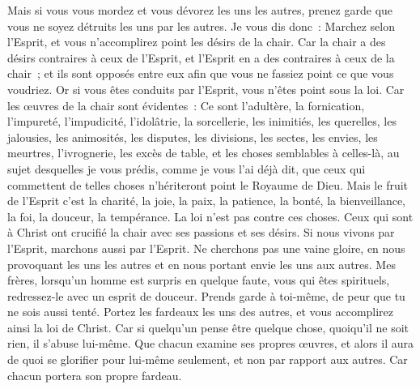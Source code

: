 \begin{multicols}{2}
Mais si vous vous mordez et vous dévorez les uns les autres, prenez garde que vous ne soyez détruits les uns par les autres.
Je vous dis donc~: Marchez selon l'Esprit, et vous n'accomplirez point les désirs de la chair.
Car la chair a des désirs contraires à ceux de l'Esprit, et l'Esprit en a des contraires à ceux de la chair~; et ils sont opposés entre eux afin que vous ne fassiez point ce que vous voudriez.
Or si vous êtes conduits par l'Esprit, vous n'êtes point sous la loi.
Car les œuvres de la chair sont évidentes~: Ce sont l'adultère, la fornication, l'impureté, l'impudicité,
l'idolâtrie, la sorcellerie, les inimitiés, les querelles, les jalousies, les animosités, les disputes, les divisions, les sectes,
les envies, les meurtres, l'ivrognerie, les excès de table, et les choses semblables à celles-là, au sujet desquelles je vous prédis, comme je vous l'ai déjà dit, que ceux qui commettent de telles choses n'hériteront point le Royaume de Dieu.
Mais le fruit de l'Esprit c'est la charité, la joie, la paix, la patience, la bonté, la bienveillance, la foi, la douceur, la tempérance.
La loi n'est pas contre ces choses.
Ceux qui sont à Christ ont crucifié la chair avec ses passions et ses désirs.
Si nous vivons par l'Esprit, marchons aussi par l'Esprit.
Ne cherchons pas une vaine gloire, en nous provoquant les uns les autres et en nous portant envie les uns aux autres.
\VerseOne{}Mes frères, lorsqu'un homme est surpris en quelque faute, vous qui êtes spirituels, redressez-le avec un esprit de douceur. Prends garde à toi-même, de peur que tu ne sois aussi tenté.
Portez les fardeaux les uns des autres, et vous accomplirez ainsi la loi de Christ.
Car si quelqu'un pense être quelque chose, quoiqu'il ne soit rien, il s'abuse lui-même.
Que chacun examine ses propres œuvres, et alors il aura de quoi se glorifier pour lui-même seulement, et non par rapport aux autres.
Car chacun portera son propre fardeau.

\end{multicols}
